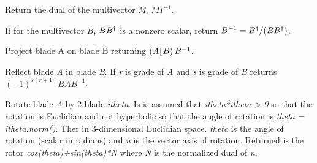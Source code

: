 \documentclass[letterpaper,10pt,english]{sphinxmanual}
\begin{document}

\begin{fulllineitems}
Return the dual of the multivector \emph{M}, $MI^{-1}$.

\end{fulllineitems}


\begin{fulllineitems}
If for the multivector $B$,  $BB^{\dagger}$ is a nonzero scalar, return $B^{-1} = B^{\dagger}/(BB^{\dagger})$.

\end{fulllineitems}


\begin{fulllineitems}
\label{GA:proj}
Project blade A on blade B returning $\left ( {A\lfloor B} \right ) B^{-1}$.

\end{fulllineitems}


\begin{fulllineitems}
\label{GA:refl}
Reflect blade \emph{A} in blade \emph{B}. If \emph{r} is grade of \emph{A} and \emph{s} is grade of \emph{B}
returns $(-1)^{s(r+1)}BAB^{-1}$.

\end{fulllineitems}


\begin{fulllineitems}
\label{GA:rot}
Rotate blade \emph{A} by 2-blade \emph{itheta}.  Is is assumed that \emph{itheta*itheta \textgreater{} 0} so that
the rotation is Euclidian and not hyperbolic so that the angle of
rotation is \emph{theta = itheta.norm()}.  Ther in 3-dimensional Euclidian space. \emph{theta} is the angle of rotation (scalar in radians) and
\emph{n} is the vector axis of rotation.  Returned is the rotor \emph{cos(theta)+sin(theta)*N} where \emph{N} is
the normalized dual of \emph{n}.

\end{fulllineitems}
\end{document}
